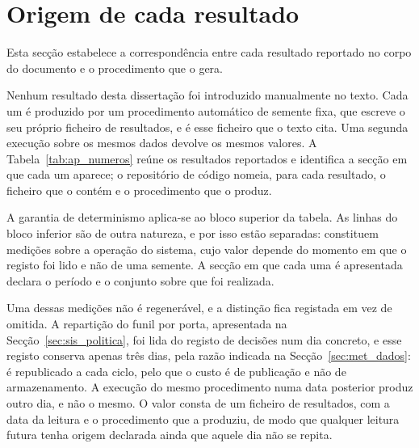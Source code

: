 \section{Origem de cada resultado}
\label{sec:ap_numeros}

Esta secção estabelece a correspondência entre cada resultado reportado no corpo do documento e o
procedimento que o gera.

Nenhum resultado desta dissertação foi introduzido manualmente no texto. Cada um é produzido por um
procedimento automático de semente fixa, que escreve o seu próprio ficheiro de resultados, e é esse
ficheiro que o texto cita. Uma segunda execução sobre os mesmos dados devolve os mesmos valores. A
Tabela~\ref{tab:ap_numeros} reúne os resultados reportados e identifica a secção em que cada um
aparece; o repositório de código nomeia, para cada resultado, o ficheiro que o contém e o
procedimento que o produz.

A garantia de determinismo aplica-se ao bloco superior da tabela. As linhas do bloco inferior são de
outra natureza, e por isso estão separadas: constituem medições sobre a operação do sistema, cujo
valor depende do momento em que o registo foi lido e não de uma semente. A secção em que cada uma é
apresentada declara o período e o conjunto sobre que foi realizada.

Uma dessas medições não é regenerável, e a distinção fica registada em vez de omitida. A repartição
do funil por porta, apresentada na Secção~\ref{sec:sis_politica}, foi lida do registo de decisões
num dia concreto, e esse registo conserva apenas três dias, pela razão indicada na
Secção~\ref{sec:met_dados}: é republicado a cada ciclo, pelo que o custo é de publicação e não de
armazenamento. A execução do mesmo procedimento numa data posterior produz outro dia, e não o mesmo.
O valor consta de um ficheiro de resultados, com a data da leitura e o procedimento que a produziu,
de modo que qualquer leitura futura tenha origem declarada ainda que aquele dia não se repita.

